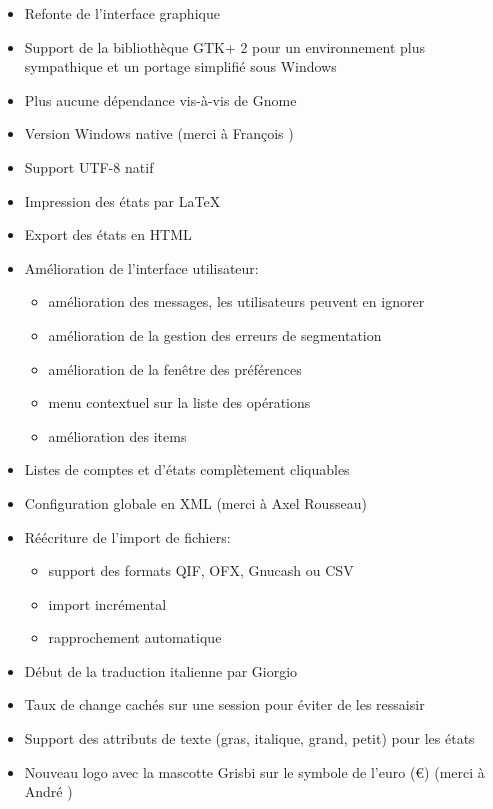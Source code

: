 \begin{itemize}
	\item Refonte de l'interface graphique
	\item Support de la bibliothèque \gls{GTK}+ 2 pour un environnement plus sympathique et un portage simplifié sous Windows
	\item Plus aucune dépendance vis-à-vis de \gls{Gnome}
	\item Version Windows native (merci à François )%
	\item Support \gls{UTF-8} natif
	\item Impression des états par \gls{LaTeX}
	\item Export des états en \gls{HTML}
	\item Amélioration de l'interface utilisateur:
		\begin{itemize}
		\item amélioration des messages, les utilisateurs peuvent en ignorer
		\item amélioration de la gestion des erreurs de segmentation
		\item amélioration de la fenêtre des préférences
		\item menu contextuel sur la liste des opérations
		\item amélioration des items
		\end{itemize}
	\item Listes de comptes et d'états complètement cliquables
	\item Configuration globale en \gls{XML} (merci à Axel Rousseau)
	\item Réécriture de l'import de fichiers:
		\begin{itemize}
		\item support des formats \gls{QIF}, \gls{OFX}, \gls{Gnucash} ou \gls{CSV}
		\item import incrémental
		\item rapprochement automatique
		\end{itemize}
	\item Début de la traduction italienne par Giorgio 
	\item Taux de change cachés sur une session pour éviter de les ressaisir
	\item Support des attributs de texte (gras, italique, grand, petit) pour les états
	\item Nouveau logo avec la mascotte Grisbi sur le symbole de l'euro (€) (merci à André )

\end{itemize}
